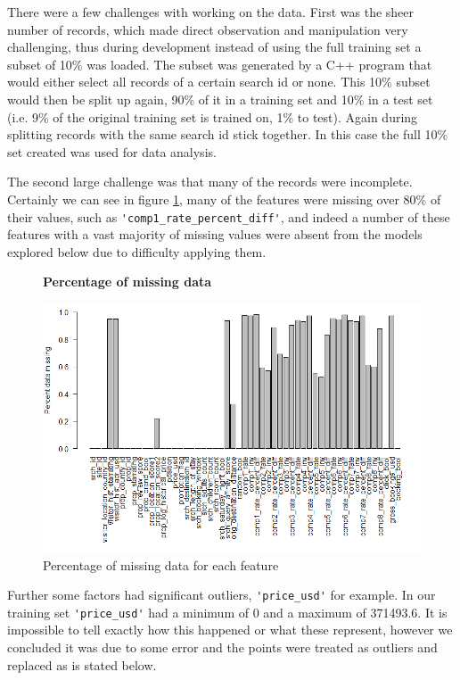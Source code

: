 \documentclass{llncs}
\begin{document}
	There were a few challenges with working on the data. First was the sheer number of records, which made direct observation and manipulation very challenging, thus during development instead of using the full training set a subset of 10\% was loaded. The subset was generated by a C++ program that would either select all records of a certain search id or none. This 10\% subset would then be split up again, 90\% of it in a training set and 10\% in a test set (i.e. 9\% of the original training set is trained on, 1\% to test). Again during splitting records with the same search id stick together. In this case the full 10\% set created was used for data analysis.

	The second large challenge was that many of the records were incomplete. Certainly we can see in figure \ref{fig:pctM}, many of the features were missing over 80\% of their values, such as \verb!'comp1_rate_percent_diff'!, and indeed a number of these features with a vast majority of missing values were absent from the models explored below due to difficulty applying them.
	
	\begin{figure}[H]
	\centering
	\textbf{Percentage of missing data}\par\medskip
		\includegraphics[scale=0.4]{figures/pct_missing.png}
	\caption{Percentage of missing data for each feature}
	\label{fig:pctM}
	\end{figure}
	
	Further some factors had significant outliers, \verb!'price_usd'! for example. In our training set \verb!'price_usd'! had a minimum of 0 and a maximum of 371493.6. It is impossible to tell exactly how this happened or what these represent, however we concluded it was due to some error and the points were treated as outliers and replaced as is stated below. 
	
\end{document}
